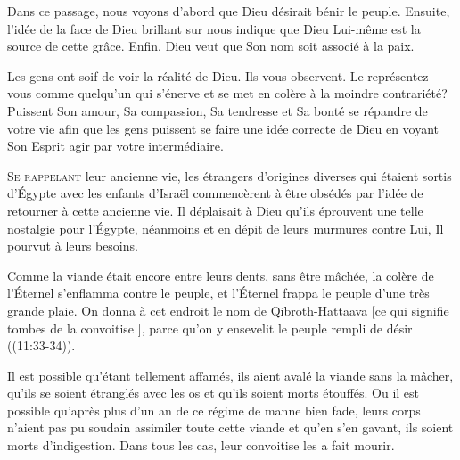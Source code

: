 Dans ce passage, nous voyons d'abord que Dieu désirait bénir le peuple.
 Ensuite, l'idée de la face de Dieu brillant sur nous indique
 que Dieu Lui-même est la source de cette grâce.
 Enfin, Dieu veut que Son nom soit associé à la paix. 

Les gens ont soif de voir la réalité de Dieu. Ils vous observent.
 Le représentez-vous comme quelqu'un qui s'énerve et se met en colère
 à la moindre contrariété? Puissent Son amour, Sa compassion,
 Sa tendresse et Sa bonté se répandre de votre vie afin que les gens
 puissent se faire une idée correcte de Dieu en voyant
 Son Esprit agir par votre intermédiaire. 

\dvrule







\lettrine{S}{e rappelant} leur ancienne vie,
 les étrangers d'origines diverses qui étaient sortis d'Égypte
 avec les enfants d'Israël commencèrent à être obsédés
 par l'idée de retourner à cette ancienne vie.
 Il déplaisait à Dieu qu'ils éprouvent une telle nostalgie pour l'Égypte,
 néanmoins et en dépit de leurs murmures contre Lui,
 Il pourvut à leurs besoins.

\Og Comme la viande était encore entre leurs dents, sans être mâchée,
 la colère de l'Éternel s'enflamma contre le peuple, et l'Éternel
 frappa le peuple d'une très grande plaie.
 On donna à cet endroit le nom de Qibroth-Hattaava
 [ce qui signifie \Og tombes de la convoitise \Fg{}],
 parce qu'on y ensevelit le peuple rempli de désir \Fg{}
 ((11:33-34)).

Il est possible qu'étant tellement affamés,
 ils aient avalé la viande sans la mâcher,
 qu'ils se soient étranglés avec les os et qu'ils soient morts étouffés.
 Ou il est possible qu'après plus d'un an de ce régime de manne bien fade,
 leurs corps n'aient pas pu soudain assimiler toute cette viande
 et qu'en s'en gavant, ils soient morts d'indigestion.
 Dans tous les cas, leur convoitise les a fait mourir.

